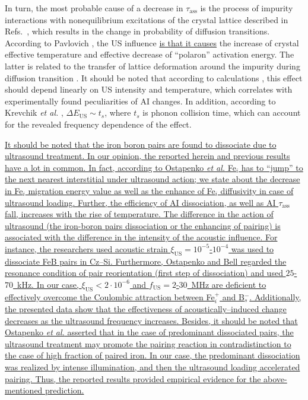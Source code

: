 \documentclass[%
 aip,jap,
 amsmath,amssymb,
 reprint,%
]{revtex4-1}
\begin{document}
In turn, the most probable cause of a decrease in $\tau_\mathrm{ass}$ is the process of impurity interactions with nonequilibrium excitations of the crystal lattice described in
Refs.~,
which results in the change in probability of diffusion transitions.
According to Pavlovich \cite{Pavlovich},
the US influence \textcolor[rgb]{0.00,0.07,1.00}{\uline{is that it causes}} the increase of crystal effective temperature and effective decrease of ``polaron'' activation energy.
The latter is related to the transfer of lattice deformation around the impurity during diffusion transition \cite{Pavlovich}.
It should be noted that according to calculations \cite{Pavlovich}, this effect should depend linearly on US intensity and temperature,
which correlates with experimentally found peculiarities of AI changes.
In addition, according to Krevchik \emph{et al.} \cite{Krevchik},
$\Delta E_\mathrm{US}\sim t_s$,
where $t_s$ is phonon collision time, which can account for the revealed frequency dependence of the effect.

\textcolor[rgb]{0.00,0.07,1.00}{\uline{
It should be noted that the iron boron pairs are found\cite{Ostapenko1995,Ostapenko1994APL,Ostapenko1995SST}
to dissociate due to ultrasound treatment.
In our opinion,
the reported herein and previous results have a lot in common.
In fact, according to Ostapenko \emph{et al.}\cite{Ostapenko1995SST}
Fe$_i$ has to ``jump'' to the next nearest interstitial under ultrasound action;
we state about the decrease in Fe$_i$ migration energy value
as well as the enhance of Fe$_i$ diffusivity
in case of ultrasound loading.
Further, the efficiency of AI dissociation, as well as AI $\tau_\mathrm{ass}$ fall, increases
with the rise of temperature.
The difference in the action of ultrasound
(the iron-boron pairs dissociation or the enhancing of pairing)
is associated with the difference in the intensity of the acoustic influence.
For instance, the researchers used acoustic strain $\xi_\mathrm{US}=10^{-5}$-$10^{-4}$
was used\cite{Ostapenko1995}
to dissociate FeB pairs in Cz--Si.
Furthermore,
Ostapenko and Bell\cite{Ostapenko1995} regarded the resonance condition of
pair reorientation (first step of dissociation) and used $25$-$70$~kHz.
In our case,  $\xi_\mathrm{US}<2\cdot10^{-6}$ and $f_\mathrm{US}=2$-$30$~MHz are deficient to effectively overcome the Coulombic attraction between Fe$_i^+$ and B$_s^-$.
Additionally, the presented data show that the effectiveness of acoustically--induced change
decreases as the ultrasound frequency increases.
Besides, it should be noted that Ostapenko \emph{et al.}\cite{Ostapenko1994APL} asserted
that in the  case  of predominant  dissociated  pairs,  the ultrasound treatment may promote  the
pairing reaction in contradistinction to the case of high fraction of paired iron.
In our case, the predominant  dissociation was realized by intense illumination, and then
the ultrasound loading accelerated pairing.
Thus, the reported results provided empirical evidence  for the above-mentioned prediction.
}}
\end{document}
